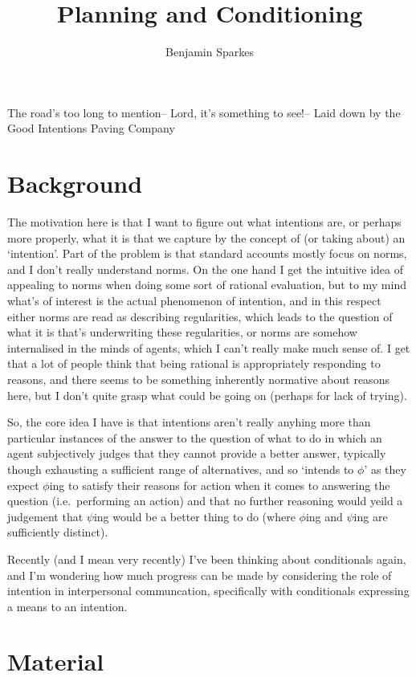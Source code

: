\documentclass[10pt]{article}
\title{Planning and Conditioning}
\author{Benjamin Sparkes}
\begin{document}
\maketitle

The road's too long to mention--
Lord, it's something to see!--
Laid down by the
Good Intentions Paving Company

\section{Background}
\label{sec:background}

The motivation here is that I want to figure out what intentions are, or perhaps more properly, what it is that we capture by the concept of (or taking about) an `intention'.
Part of the problem is that standard accounts mostly focus on norms, and I don't really understand norms.
On the one hand I get the intuitive idea of appealing to norms when doing some sort of rational evaluation, but to my mind what's of interest is the actual phenomenon of intention, and in this respect either norms are read as describing regularities, which leads to the question of what it is that's underwriting these regularities, or norms are somehow internalised in the minds of agents, which I can't really make much sense of.
I get that a lot of people think that being rational is appropriately responding to reasons, and there seems to be something inherently normative about reasons here, but I don't quite grasp what could be going on (perhaps for lack of trying).

So, the core idea I have is that intentions aren't really anyhing more than particular instances of the answer to the question of what to do in which an agent subjectively judges that they cannot provide a better answer, typically though exhausting a sufficient range of alternatives, and so `intends to \(\phi\)' as they expect \(\phi\)ing to satisfy their reasons for action when it comes to answering the question (i.e.\ performing an action) and that no further reasoning would yeild a judgement that \(\psi\)ing would be a better thing to do (where \(\phi\)ing and \(\psi\)ing are sufficiently distinct).

Recently (and I mean very recently) I've been thinking about conditionals again, and I'm wondering how much progress can be made by considering the role of intention in interpersonal communcation, specifically with conditionals expressing a means to an intention.


\section{Material}
\label{sec:material}
\end{document}
